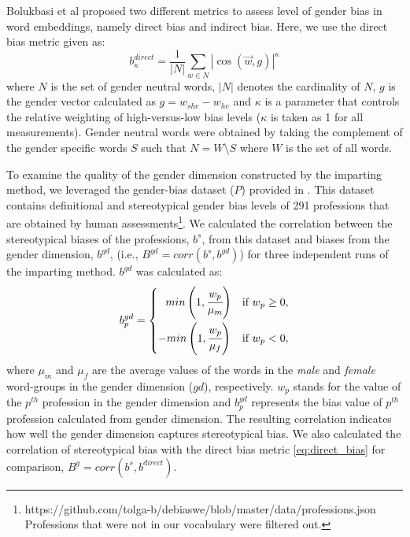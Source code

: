 \documentclass[11pt,a4paper]{article}
\begin{document}
Bolukbasi et al \citep{bolukbasi16debiasing} proposed two different metrics to assess level of gender bias in word embeddings, namely direct bias and indirect bias. Here, we use the direct bias metric given as:
\begin{equation}
b^{direct}_\kappa = \frac{1}{|N|}\sum_{w\in N}|\cos(\vec{w},g)|^\kappa
\label{eq:direct_bias}
\end{equation}
where $N$ is the set of gender neutral words, $|N|$ denotes the cardinality of $N$, $g$ is the gender vector calculated as $g = w_{she} - w_{he}$ and $\kappa$ is a parameter that controls the relative weighting of high-versus-low bias levels ($\kappa$ is taken as 1 for all measurements). Gender neutral words were obtained by taking the complement of the gender specific words $S$ such that $N = W$\textbackslash $S$ where $W$ is the set of all words. 

To examine the quality of the gender dimension constructed by the imparting method, we leveraged the gender-bias dataset ($P$) provided in \citep{bolukbasi16debiasing}. This dataset contains definitional and stereotypical gender bias levels of 291 professions that are obtained by human assessments\footnote{https://github.com/tolga-b/debiaswe/blob/master/data/professions.json\\Professions that were not in our vocabulary were filtered out.}. We calculated the correlation between the stereotypical biases of the professions, $b^s$, from this dataset and biases from the gender dimension, $b^{gd}$, (i.e., $ B^{gd} = corr(b^s, b^{gd})$) for three independent runs of the imparting method. $b^{gd}$ was calculated as: 
\begin{align}
\begin{split}
     b^{gd}_p = 
     \begin{cases}
		~~min \left( 1, \cfrac{w_{p}}{\mu_m} \right) & \text{if } w_{p} \geq 0, \vspace{0.1cm} \\ 
		-min \left( 1, \cfrac{w_{p}}{\mu_f} \right) & \text{if } w_{p} < 0,
	\end{cases}
\end{split}
\label{eq:measure_bias}
\end{align}
where $\mu_m$ and $\mu_f$ are the average values of the words in the \textit{male} and \textit{female} word-groups in the gender dimension ($gd$), respectively. $w_p$ stands for the value of the $p^{th}$ profession in the gender dimension and $b^{gd}_p$ represents the bias value of $p^{th}$ profession calculated from gender dimension. The resulting correlation indicates how well the gender dimension captures stereotypical bias. We also calculated the correlation of stereotypical bias with the direct bias metric \eqref{eq:direct_bias} for comparison, $B^g = corr(b^s, b^{direct})$.
\end{document}
